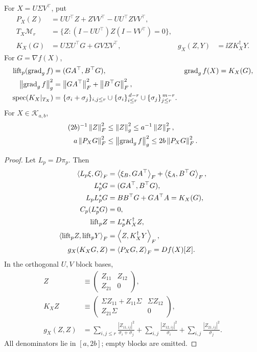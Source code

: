 \begin{theorem}
\label{thm:metric-explicit}
For $X=U\Sigma V^\top$, put
\begin{align}
P_X(Z)&=UU^\top Z+ZVV^\top-UU^\top ZVV^\top,\\
T_X\mathcal M_r&=\{Z:(I-UU^\top)Z(I-VV^\top)=0\},\\
K_X(G)&=U\Sigma U^\top G+GV\Sigma V^\top,&
g_X(Z,Y)&=\ii Z{K_X^\dagger Y}.
\label{eq:rigid-metric}
\end{align}
For $G=\nabla f(X)$,
\begin{align}
{\rm lift}_p(\operatorname{grad}_g f)&=(GA^\top,B^\top G),&
\operatorname{grad}_g f(X)&=K_X(G),\\
\left\lVert\operatorname{grad}_g f\right\rVert_g^2&=\left\lVert GA^\top\right\rVert_F^2+\left\lVert B^\top G\right\rVert_F^2,\\
{\rm spec}(K_X|_{T_X})
&=\{\sigma_i+\sigma_j\}_{i,j\leq r}
\cup\{\sigma_i\}_{i\leq r}^{\,d-r}
\cup\{\sigma_j\}_{j\leq r}^{\,m-r}.
\label{eq:rigid-spectrum}
\end{align}
For $X\in\mathcal K_{a,b}$,
\begin{align}
(2b)^{-1}\left\lVert Z\right\rVert_F^2&\leq\left\lVert Z\right\rVert_g^2\leq a^{-1}\left\lVert Z\right\rVert_F^2,\\
a\left\lVert P_XG\right\rVert_F^2&\leq\left\lVert\operatorname{grad}_g f\right\rVert_g^2\leq2b\left\lVert P_XG\right\rVert_F^2.
\label{eq:rigid-equivalence}
\end{align}
\end{theorem}
\begin{proof}
Let $L_p=D\pi_p$. Then
\begin{align}
\left\langle L_p\xi,G\right\rangle_F&=\left\langle\xi_B,GA^\top\right\rangle_F+\left\langle\xi_A,B^\top G\right\rangle_F,\\
L_p^*G&=(GA^\top,B^\top G),\\
L_pL_p^*G&=BB^\top G+GA^\top A=K_X(G),\\
C_p(L_p^*G)&=0,\\
{\rm lift}_pZ&=L_p^*K_X^\dagger Z,\\
\left\langle{\rm lift}_pZ,{\rm lift}_pY\right\rangle_F&=\left\langle Z,K_X^\dagger Y\right\rangle_F,\\
g_X(K_XG,Z)&=\left\langle P_XG,Z\right\rangle_F=Df(X)[Z].
\end{align}
In the orthogonal $U,V$ block bases,
\begin{align}
Z&\equiv\begin{pmatrix}Z_{11}&Z_{12}\\Z_{21}&0\end{pmatrix},\\
K_XZ&\equiv\begin{pmatrix}
\Sigma Z_{11}+Z_{11}\Sigma&\Sigma Z_{12}\\Z_{21}\Sigma&0
\end{pmatrix},\\
g_X(Z,Z)&=\sum_{i,j\leq r}\frac{|Z_{11,ij}|^2}{\sigma_i+\sigma_j}
+\sum_{i,j}\frac{|Z_{12,ij}|^2}{\sigma_i}
+\sum_{i,j}\frac{|Z_{21,ij}|^2}{\sigma_j}.
\end{align}
All denominators lie in $[a,2b]$; empty blocks are omitted.
\end{proof}

